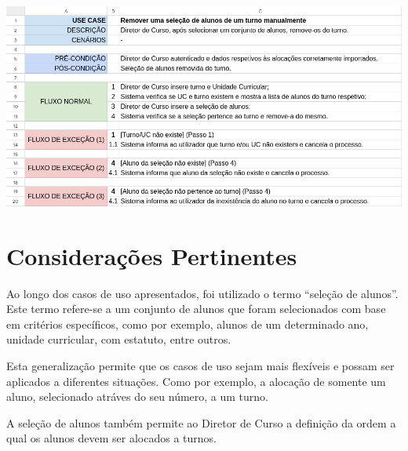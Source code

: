 \documentclass[a4paper,12pt]{scrreprt}
\begin{document}
\begin{minipage}{\textwidth}
    \centering
    \includegraphics[width=1\textwidth]{images/use-cases/descriptions/32-Remover uma seleção de alunos de um turno manualmente.png}
    \label{fig:3-32-remover_uma_selecao_de_alunos_de_um_turno_manualmente}
\end{minipage}



\chapter{Considerações Pertinentes}
\vspace{1cm}

Ao longo dos casos de uso apresentados, foi utilizado o termo “seleção de alunos”.
Este termo refere-se a um conjunto de alunos que foram selecionados com base em critérios específicos,
como por exemplo, alunos de um determinado ano, unidade curricular, com estatuto, entre outros.

Esta generalização permite que os casos de uso sejam mais flexíveis
e possam ser aplicados a diferentes situações. Como por exemplo, a alocação de somente
um aluno, selecionado atráves do seu número, a um turno.

A seleção de alunos também permite ao Diretor de Curso a definição da ordem
a qual os alunos devem ser alocados a turnos.
\end{document}
